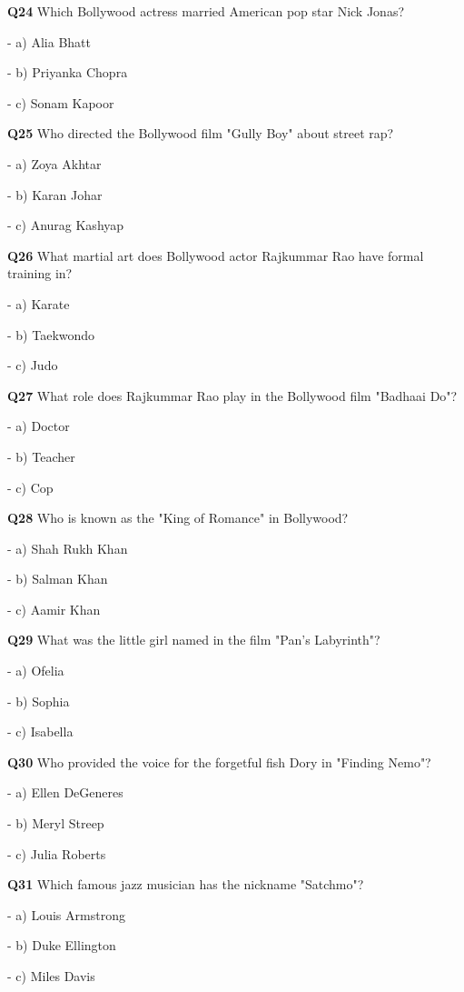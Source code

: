 \textbf{Q24} Which Bollywood actress married American pop star Nick Jonas?\par
\quad - a) Alia Bhatt\par
\quad - b) Priyanka Chopra\par
\quad - c) Sonam Kapoor\par

\textbf{Q25} Who directed the Bollywood film "Gully Boy" about street rap?\par
\quad - a) Zoya Akhtar\par
\quad - b) Karan Johar\par
\quad - c) Anurag Kashyap\par

\textbf{Q26} What martial art does Bollywood actor Rajkummar Rao have formal training in?\par
\quad - a) Karate\par
\quad - b) Taekwondo\par
\quad - c) Judo\par

\textbf{Q27} What role does Rajkummar Rao play in the Bollywood film "Badhaai Do"?\par
\quad - a) Doctor\par
\quad - b) Teacher\par
\quad - c) Cop\par

\textbf{Q28} Who is known as the "King of Romance" in Bollywood?\par
\quad - a) Shah Rukh Khan\par
\quad - b) Salman Khan\par
\quad - c) Aamir Khan\par

\textbf{Q29} What was the little girl named in the film "Pan's Labyrinth"?\par
\quad - a) Ofelia\par
\quad - b) Sophia\par
\quad - c) Isabella\par

\textbf{Q30} Who provided the voice for the forgetful fish Dory in "Finding Nemo"?\par
\quad - a) Ellen DeGeneres\par
\quad - b) Meryl Streep\par
\quad - c) Julia Roberts\par

\textbf{Q31} Which famous jazz musician has the nickname "Satchmo"?\par
\quad - a) Louis Armstrong\par
\quad - b) Duke Ellington\par
\quad - c) Miles Davis\par

